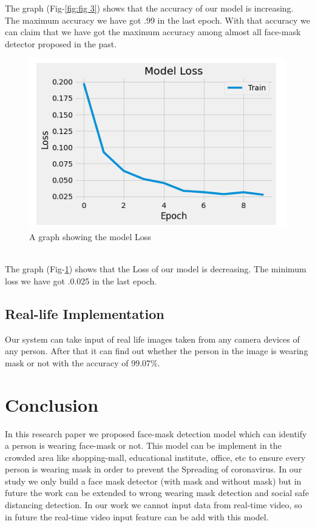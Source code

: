 \documentclass[conference]{IEEEtran}
\begin{document}
The graph (Fig-\ref{fig:fig 3}) shows that the accuracy of our model is increasing. The maximum accuracy we have got .99 in the last epoch. With that accuracy we can claim that we have got the maximum accuracy among almost all face-mask detector proposed in the past. 
\begin{center}
\begin{figure}[htbp]
  \includegraphics[width=1.0\linewidth]{loss.png}
  \caption{A graph showing the model Loss}
  \label{fig:fig 4}
\end{figure}
\end{center} 
\\

The graph (Fig-\ref{fig:fig 4}) shows that the Loss of our model is decreasing. The minimum loss we have got .0.025 in the last epoch.
\subsection{Real-life Implementation}
Our system can take input of real life images taken from any camera devices of any person. After that it  can find out whether the person in the image is wearing mask or not with the accuracy of 99.07\%.  

\section{Conclusion}
In this research paper we proposed face-mask detection model which can identify a person is wearing face-mask or not. This model can be implement in the crowded area like shopping-mall, educational institute, office, etc to ensure every person is wearing mask in order to prevent the Spreading of coronavirus. In our study we only build a face mask detector (with mask and without mask) but in future the work can be extended to wrong wearing mask detection and social safe distancing detection. In our work we cannot input data from real-time video, so in future the real-time video input feature can be add with this model. 



\end{document}
